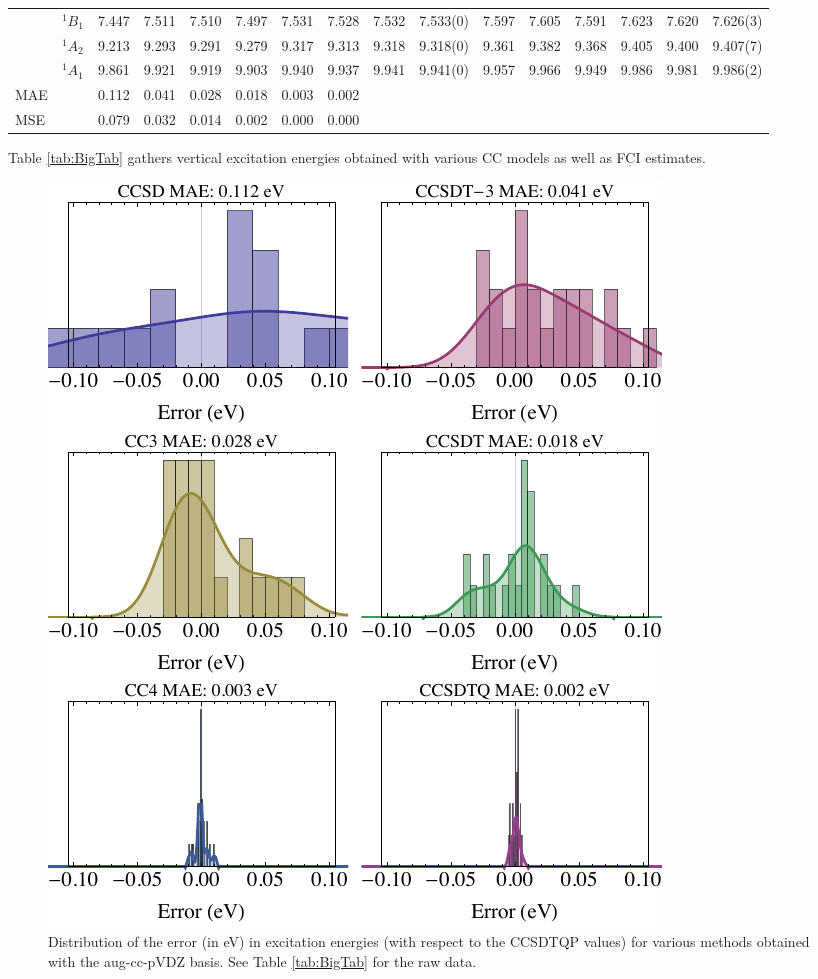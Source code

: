 \documentclass[aip,jcp,reprint,noshowkeys,superscriptaddress]{revtex4-1}
\begin{document}
\begin{squeezetable}
\begin{table}
\begin{ruledtabular}
\begin{tabular}{llrrrrrrrrrrrrrr}
	\ce{H2O}	&	$^1B_1$  		&7.447	&7.511	&7.510	&7.497	&7.531	&7.528	&7.532	&7.533(0)	&7.597	&7.605	&7.591	&7.623	&7.620	&7.626(3)\\
				&	$^1A_2$  		&9.213	&9.293	&9.291	&9.279	&9.317	&9.313	&9.318	&9.318(0)	&9.361	&9.382	&9.368	&9.405	&9.400	&9.407(7)\\
				&	$^1A_1$  		&9.861	&9.921	&9.919	&9.903	&9.940	&9.937	&9.941	&9.941(0)	&9.957	&9.966	&9.949	&9.986	&9.981	&9.986(2)\\
	\hline
	MAE			&					&0.112	&0.041	&0.028	&0.018	&0.003	&0.002	\\
	MSE			&					&0.079	&0.032	&0.014	&0.002	&0.000	&0.000	\\
	\end{tabular}
	\end{ruledtabular}
\end{table}
\end{squeezetable}

Table \ref{tab:BigTab} gathers vertical excitation energies obtained with various CC models as well as FCI estimates.

\begin{figure}
	\includegraphics[width=\linewidth]{histograms_MAE_AVDZ}
	\caption{
	Distribution of the error (in eV) in excitation energies (with respect to the CCSDTQP values) for various methods obtained with the aug-cc-pVDZ basis.
	See Table \ref{tab:BigTab} for the raw data.
	\label{fig:MAE}}
\end{figure}
\end{document}
